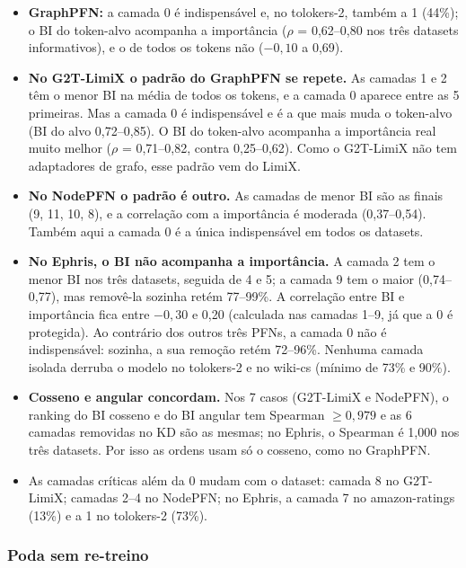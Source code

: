 \documentclass[12pt,a4paper]{article}
\begin{document}
\begin{itemize}
  \item \textbf{GraphPFN:} a camada 0 é indispensável e, no tolokers-2, também a 1 (44\%); o BI do token-alvo acompanha a importância ($\rho$ = 0,62--0,80 nos três datasets informativos), e o de todos os tokens não ($-0{,}10$ a 0,69).
  \item \textbf{No G2T-LimiX o padrão do GraphPFN se repete.} As camadas 1 e 2 têm o menor BI na média de todos os tokens, e a camada 0 aparece entre as 5 primeiras. Mas a camada 0 é indispensável e é a que mais muda o token-alvo (BI do alvo 0,72--0,85). O BI do token-alvo acompanha a importância real muito melhor ($\rho$ = 0,71--0,82, contra 0,25--0,62). Como o G2T-LimiX não tem adaptadores de grafo, esse padrão vem do LimiX.
  \item \textbf{No NodePFN o padrão é outro.} As camadas de menor BI são as finais (9, 11, 10, 8), e a correlação com a importância é moderada (0,37--0,54). Também aqui a camada 0 é a única indispensável em todos os datasets.
  \item \textbf{No Ephris, o BI não acompanha a importância.} A camada 2 tem o menor BI nos três datasets, seguida de 4 e 5; a camada 9 tem o maior (0,74--0,77), mas removê-la sozinha retém 77--99\%. A correlação entre BI e importância fica entre $-0{,}30$ e 0,20 (calculada nas camadas 1--9, já que a 0 é protegida). Ao contrário dos outros três PFNs, a camada 0 não é indispensável: sozinha, a sua remoção retém 72--96\%. Nenhuma camada isolada derruba o modelo no tolokers-2 e no wiki-cs (mínimo de 73\% e 90\%).
  \item \textbf{Cosseno e angular concordam.} Nos 7 casos (G2T-LimiX e NodePFN), o ranking do BI cosseno e do BI angular tem Spearman $\geq 0{,}979$ e as 6 camadas removidas no KD são as mesmas; no Ephris, o Spearman é 1,000 nos três datasets. Por isso as ordens usam só o cosseno, como no GraphPFN.
  \item As camadas críticas além da 0 mudam com o dataset: camada 8 no G2T-LimiX; camadas 2--4 no NodePFN; no Ephris, a camada 7 no amazon-ratings (13\%) e a 1 no tolokers-2 (73\%).
\end{itemize}

\subsubsection{Poda sem re-treino}
\end{document}
